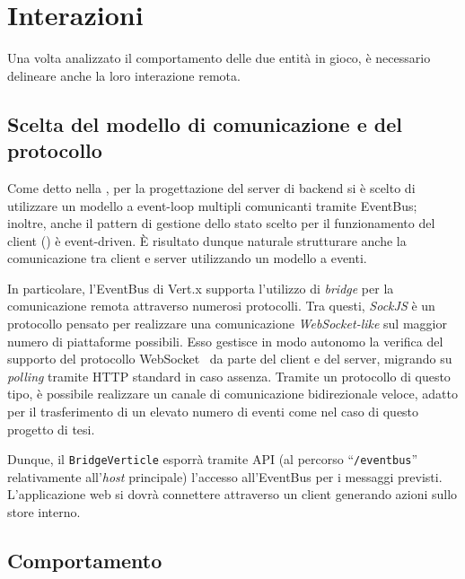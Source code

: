     

  \section{Interazioni}\label{sec:arch:interaction}

    Una volta analizzato il comportamento delle due entità in gioco, è necessario delineare anche la loro interazione remota.

    \subsection{Scelta del modello di comunicazione e del protocollo}

      Come detto nella , per la progettazione del server di backend si è scelto di utilizzare un modello a event-loop multipli comunicanti tramite EventBus;
      inoltre, anche il pattern di gestione dello stato scelto per il funzionamento del client () è event-driven.
      È risultato dunque naturale strutturare anche la comunicazione tra client e server utilizzando un modello a eventi.

      In particolare, l'EventBus di Vert.x supporta l'utilizzo di \emph{bridge} per la comunicazione remota attraverso numerosi protocolli.
      Tra questi, \emph{SockJS} è un protocollo pensato per realizzare una comunicazione \emph{WebSocket-like} sul maggior numero di piattaforme possibili.
      Esso gestisce in modo autonomo la verifica del supporto del protocollo WebSocket~\cite{Melnikov2011} da parte del client e del server, migrando su \emph{polling} tramite HTTP standard in caso assenza.
      Tramite un protocollo di questo tipo, è possibile realizzare un canale di comunicazione bidirezionale veloce, adatto per il trasferimento di un elevato numero di eventi come nel caso di questo progetto di tesi.

      Dunque, il \texttt{BridgeVerticle} esporrà tramite API (al percorso ``\texttt{/eventbus}'' relativamente all'\emph{host} principale) l'accesso all'EventBus per i messaggi previsti.
      L'applicazione web si dovrà connettere attraverso un client generando azioni sullo store interno.

    \subsection{Comportamento}

